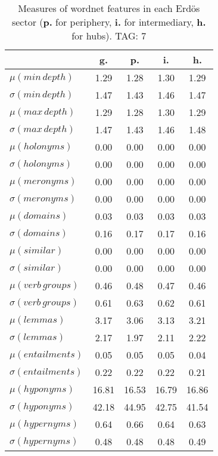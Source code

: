 \begin{table}[h!]
\begin{center}
\begin{tabular}{| l | c | c | c | c |}\hline
 & g. & p. & i. & h. \\\hline
$\mu(min\,depth)$ & 1.29  & 1.28  & 1.30  & 1.29 \\\hline
$\sigma(min\,depth)$ & 1.47  & 1.43  & 1.46  & 1.47 \\\hline
$\mu(max\,depth)$ & 1.29  & 1.28  & 1.30  & 1.29 \\\hline
$\sigma(max\,depth)$ & 1.47  & 1.43  & 1.46  & 1.48 \\\hline
$\mu(holonyms)$ & 0.00  & 0.00  & 0.00  & 0.00 \\\hline
$\sigma(holonyms)$ & 0.00  & 0.00  & 0.00  & 0.00 \\\hline
$\mu(meronyms)$ & 0.00  & 0.00  & 0.00  & 0.00 \\\hline
$\sigma(meronyms)$ & 0.00  & 0.00  & 0.00  & 0.00 \\\hline
$\mu(domains)$ & 0.03  & 0.03  & 0.03  & 0.03 \\\hline
$\sigma(domains)$ & 0.16  & 0.17  & 0.17  & 0.16 \\\hline
$\mu(similar)$ & 0.00  & 0.00  & 0.00  & 0.00 \\\hline
$\sigma(similar)$ & 0.00  & 0.00  & 0.00  & 0.00 \\\hline
$\mu(verb\,groups)$ & 0.46  & 0.48  & 0.47  & 0.46 \\\hline
$\sigma(verb\,groups)$ & 0.61  & 0.63  & 0.62  & 0.61 \\\hline
$\mu(lemmas)$ & 3.17  & 3.06  & 3.13  & 3.21 \\\hline
$\sigma(lemmas)$ & 2.17  & 1.97  & 2.11  & 2.22 \\\hline
$\mu(entailments)$ & 0.05  & 0.05  & 0.05  & 0.04 \\\hline
$\sigma(entailments)$ & 0.22  & 0.22  & 0.22  & 0.21 \\\hline
$\mu(hyponyms)$ & 16.81  & 16.53  & 16.79  & 16.86 \\\hline
$\sigma(hyponyms)$ & 42.18  & 44.95  & 42.75  & 41.54 \\\hline
$\mu(hypernyms)$ & 0.64  & 0.66  & 0.64  & 0.63 \\\hline
$\sigma(hypernyms)$ & 0.48  & 0.48  & 0.48  & 0.49 \\\hline
\end{tabular}
\caption{Measures of wordnet features in each Erd\"os sector ({{\bf p.}} for periphery, {{\bf i.}} for intermediary, {{\bf h.}} for hubs). TAG: 7}
\end{center}
\end{table}